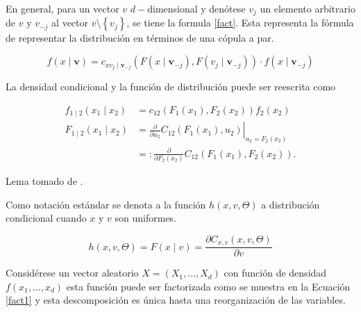 En general, para un vector $v$ $d-$dimensional y denótese $v_j$ un elemento arbitrario de $v$ y $v_{-j}$ al vector $v \setminus \left\{ v_j \right\}$, se tiene la formula \eqref{fact}. Esta representa la fórmula de representar la distribución en términos de una cópula a par.

\begin{equation}\label{fact}
    f(x \mid \boldsymbol{v}) = c_{x v_j \mid \boldsymbol{v}_{-j}} (  F \left(x \mid \boldsymbol{v}_{-j}\right), F\left(v_j \mid \boldsymbol{v}_{-j}\right) ) \cdot f\left(x \mid \boldsymbol{v}_{-j}\right)
\end{equation}

\begin{lema}La densidad condicional y la función de distribución puede ser reescrita como

\begin{equation}
    \begin{aligned}
    f_{1 \mid 2}\left(x_1 \mid x_2\right) & =c_{12}\left(F_1\left(x_1\right), F_2\left(x_2\right)\right) f_2\left(x_2\right) \\
    F_{1 \mid 2}\left(x_1 \mid x_2\right) & =\left.\frac{\partial}{\partial u_2} C_{12}\left(F_1\left(x_1\right), u_2\right)\right|_{u_2=F_2\left(x_2\right)} \\
    & =: \frac{\partial}{\partial F_2\left(x_2\right)} C_{12}\left(F_1\left(x_1\right), F_2\left(x_2\right)\right) .
    \end{aligned}
\end{equation}

Lema tomado de \cite[pag 20]{czadoAnalyzing}.
\end{lema}

Como notación estándar se denota a la función $h(x, v, \Theta)$ a distribución condicional cuando $x$ y $v$ son uniformes. 

\begin{equation}
    h(x, v, \Theta) = F(x \mid v)=\frac{\partial C_{x, v}(x, v, \Theta)}{\partial v}
\end{equation}

Considérese un vector aleatorio $X = (X_1, \dots, X_d)$ con función de densidad $f(x_1, \dots, x_d)$ esta función puede ser factorizada como se muestra en la Ecuación \eqref{fact1} y esta descomposición es única hasta una reorganización de las variables.

